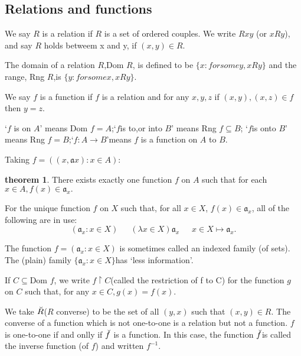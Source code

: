 \documentclass[a4paper,11pt]{article}%
\theoremstyle{remark}
\theoremstyle{definition}
\newtheorem{theorem}{theorem}[section]
\theoremstyle{definition}
\theoremstyle{plain}
\theoremstyle{definition}
\begin{document}
\subsection{Relations and functions}
We say $R$ is a relation if $R$ is a set of ordered couples. We write $Rxy$
(or $xRy$), and say $R$ holds betweem x and y, if $(x,y)\in R$.

The domain of a relation $R$,Dom $R$, is defined to be $\{x:for some y, xRy\}$ and
the range, Rng $R$,is $\{y:for some x, xRy\}$.

We say $f$ is a function if $f$ is a relation and for any $x,y,z$ if
$(x,y),(x,z)\in f$ then $y=z$.

`$f$ is on $A$' means Dom $f=A$;`$f$is to,or into $B$' means Rng $f\subseteq B$;
`$f$is onto $B$' means Rng $f=B$;`$f:A\rightarrow B$'means $f$ is a function 
on $A$ to $B$.

Taking $f=((x,\mathfrak{a}x):x\in A):$
\begin{theorem}
    There exists exactly one function $f$ on $A$ such that for each $x\in A,f(x)\in \mathfrak{a}_x.$
\end{theorem}
For the unique function $f$ on $X$ such that, for all $x\in X$, $f(x)\in \mathfrak{a}_x$,
all of the following are in use:
\[(\mathfrak{a}_x:x\in X)\phantom{111}(\lambda x\in X)\mathfrak{a}_x\phantom{111}x \in X \mapsto \mathfrak{a}_x.\]

The function $f=(\mathfrak{a}_x:x\in X)$ is sometimes called an indexed family (of sets).
The (plain) family $\{\mathfrak{a}_x:x\in X\}$has `less information'.

If $C\subseteq $Dom $f$, we write $f\upharpoonright C$(called the restriction of f to C)
for the function $g$ on $C$ such that, for any $x\in C,g(x)=f(x)$.

We take $\Breve{R}$($R$ converse) to be the set of all $(y,x)$ such that $(x,y)\in R$.
The converse of a function which is not one-to-one is a relation but not a function.
$f$ is one-to-one if and onlly if $\Breve{f}$ is a function. In this case,
the function $\Breve{f}$is called the inverse function (of $f$) and written $f^{-1}$.
\end{document}
